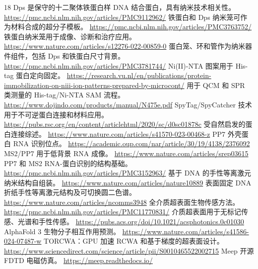 \documentclass[11pt]{ctexart}
\begin{document}
\begin{thebibliography}{18}
 Dps 是保守的十二聚体铁蛋白样 DNA 结合蛋白，具有纳米技术相关性。 \url{https://pmc.ncbi.nlm.nih.gov/articles/PMC9112962/}
 铁蛋白和 Dps 纳米笼可作为材料合成的超分子模板。 \url{https://pmc.ncbi.nlm.nih.gov/articles/PMC3763752/}
 铁蛋白纳米笼用于成像、诊断和治疗应用。 \url{https://www.nature.com/articles/s12276-022-00859-0}
 蛋白笼、环和管作为纳米器件组件，包括 Dps 和铁蛋白尺寸背景。 \url{https://pmc.ncbi.nlm.nih.gov/articles/PMC3781744/}
 Ni(II)-NTA 图案用于 His-tag 蛋白定向固定。 \url{https://research.vu.nl/en/publications/protein-immobilization-on-niii-ion-patterns-prepared-by-microcont/}
 用于 QCM 和 SPR 类测量的 His-tag/Ni-NTA SAM 流程。 \url{https://www.dojindo.com/products/manual/N475e.pdf}
 SpyTag/SpyCatcher 技术用于不可逆蛋白连接和材料应用。 \url{https://pubs.rsc.org/en/content/articlehtml/2020/sc/d0sc01878c}
 受自然启发的蛋白连接综述。 \url{https://www.nature.com/articles/s41570-023-00468-z}
 PP7 外壳蛋白 RNA 识别位点。 \url{https://academic.oup.com/nar/article/30/19/4138/2376092}
 MS2/PP7 用于低背景 RNA 成像。 \url{https://www.nature.com/articles/srep03615}
 PP7 和 MS2 RNA-蛋白识别的结构基础。 \url{https://pmc.ncbi.nlm.nih.gov/articles/PMC3152963/}
 基于 DNA 的手性等离激元纳米结构自组装。 \url{https://www.nature.com/articles/nature10889}
 表面固定 DNA 折纸手性等离激元结构及可切换圆二色谱。 \url{https://www.nature.com/articles/ncomms3948}
 全介质超表面生物传感方法。 \url{https://pmc.ncbi.nlm.nih.gov/articles/PMC11770831/}
 介质超表面用于无标记传感、光谱和手性传感。 \url{https://pubs.acs.org/doi/10.1021/acsphotonics.0c01030}
 AlphaFold 3 生物分子相互作用预测。 \url{https://www.nature.com/articles/s41586-024-07487-w}
 TORCWA：GPU 加速 RCWA 和基于梯度的超表面设计。 \url{https://www.sciencedirect.com/science/article/pii/S0010465522002715}
 Meep 开源 FDTD 电磁仿真。 \url{https://meep.readthedocs.io/}
\end{thebibliography}
\end{document}
